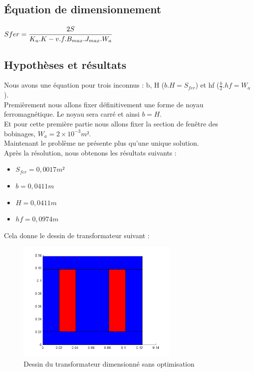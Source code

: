 \subsection{Équation de dimensionnement}
$ Sfer = \cfrac{2S}{K_u.K-v.f.B_{max}.J_{max}.W_a}$

\subsection{Hypothèses et résultats}
Nous avons une équation pour trois inconnus : b, H ($b.H = S_{fer}$) et hf ($\frac{b}{2}.hf = W_a$).\\
Premièrement nous allons fixer définitivement une forme de noyau ferromagnétique. Le noyau sera carré et ainsi $b = H$.\\
Et pour cette première partie nous allons fixer la section de fenêtre des bobinages, $W_a = 2\times{}10^{-3} m²$.\\
Maintenant le problème ne présente plus qu'une unique solution.\\

Après la résolution, nous obtenons les résultats suivants : \\
\begin{itemize}
\item $S_{fer} = 0,0017 m² $
\item $b = 0,0411 m $
\item $H = 0,0411 m $
\item $hf = 0,0974 m $
\end{itemize}

Cela donne le dessin de transformateur suivant :\\
\begin{figure}
	\begin{center}
	\includegraphics[width=0.7\textwidth]{images/TP1_transfo_carre}
	\caption{Dessin du transformateur dimensionné sans optimisation}\label{img:dessinTransfoCarre}
	\end{center}
\end{figure}
\FloatBarrier 


